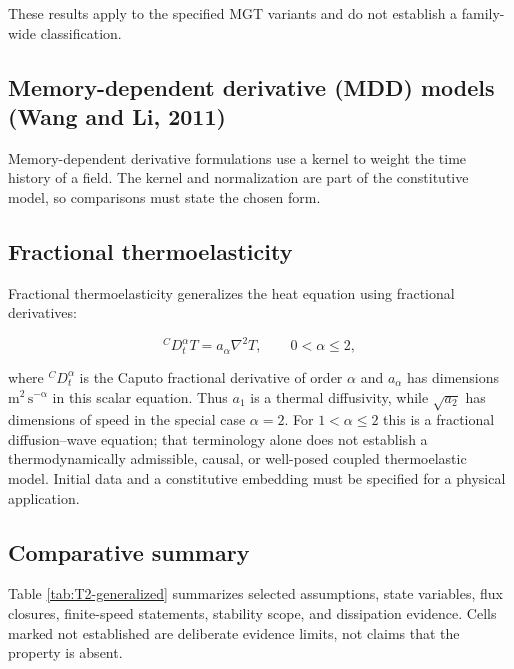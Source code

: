 These results apply to the specified MGT variants and do not establish a family-wide classification.

\subsection{Memory-dependent derivative (MDD) models (Wang and Li, 2011)}
\label{sec:4.10}

Memory-dependent derivative formulations use a kernel to weight the time history of a field. The kernel and normalization are part of the constitutive model, so comparisons must state the chosen form.

\subsection{Fractional thermoelasticity}
\label{sec:4.11}

Fractional thermoelasticity generalizes the heat equation using fractional derivatives:

\begin{equation}
{}^C D_t^\alpha T = a_\alpha\nabla^2 T, \qquad 0 < \alpha \leq 2,
\label{eq:4.20}
\end{equation}

where ${}^C D_t^\alpha$ is the Caputo fractional derivative of order $\alpha$ and $a_\alpha$ has dimensions $\mathrm{m^2\,s^{-\alpha}}$ in this scalar equation. Thus $a_1$ is a thermal diffusivity, while $\sqrt{a_2}$ has dimensions of speed in the special case $\alpha=2$. For $1<\alpha\leq2$ this is a fractional diffusion--wave equation; that terminology alone does not establish a thermodynamically admissible, causal, or well-posed coupled thermoelastic model. Initial data and a constitutive embedding must be specified for a physical application.

\subsection{Comparative summary}
\label{sec:4.12}

Table \ref{tab:T2-generalized} summarizes selected assumptions, state variables, flux closures, finite-speed statements, stability scope, and dissipation evidence. Cells marked not established are deliberate evidence limits, not claims that the property is absent.

